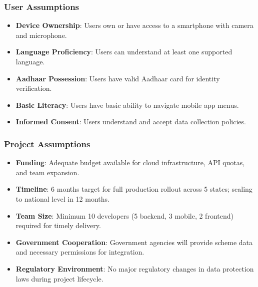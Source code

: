 \subsubsection{User Assumptions}
\begin{itemize}
    \item \textbf{Device Ownership}: Users own or have access to a smartphone with camera and microphone.
    \item \textbf{Language Proficiency}: Users can understand at least one supported language.
    \item \textbf{Aadhaar Possession}: Users have valid Aadhaar card for identity verification.
    \item \textbf{Basic Literacy}: Users have basic ability to navigate mobile app menus.
    \item \textbf{Informed Consent}: Users understand and accept data collection policies.
\end{itemize}

\subsubsection{Project Assumptions}
\begin{itemize}
    \item \textbf{Funding}: Adequate budget available for cloud infrastructure, API quotas, and team expansion.
    \item \textbf{Timeline}: 6 months target for full production rollout across 5 states; scaling to national level in 12 months.
    \item \textbf{Team Size}: Minimum 10 developers (5 backend, 3 mobile, 2 frontend) required for timely delivery.
    \item \textbf{Government Cooperation}: Government agencies will provide scheme data and necessary permissions for integration.
    \item \textbf{Regulatory Environment}: No major regulatory changes in data protection laws during project lifecycle.
\end{itemize}
